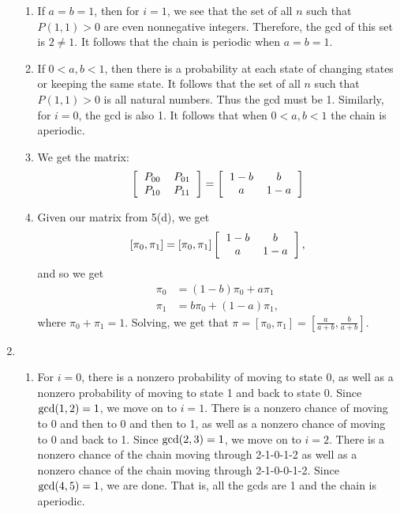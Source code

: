 \begin{enumerate}
\begin{enumerate}
        \item If $a = b = 1$, then for $i = 1$, we see that the set of all $n$ such that $P(1, 1) > 0$ are even nonnegative integers. Therefore, the gcd of this set is $2 \neq 1$. It follows that the chain is periodic when $a = b = 1$.
        
        \item If $0 < a, b < 1$, then there is a probability at each state of changing states or keeping the same state. It follows that the set of all $n$ such that $P(1, 1) > 0$ is all natural numbers. Thus the gcd must be 1. Similarly, for $i = 0$, the gcd is also 1. It follows that when $0 < a, b < 1$ the chain is aperiodic.
        
        \item We get the matrix:
        \[
        \left[\begin{tabular}{cc}
            $P_{00}$ & $P_{01}$ \\
            $P_{10}$ & $P_{11}$
        \end{tabular}\right]
        =
        \left[\begin{tabular}{cc}
            $1 - b$ & $b$ \\
            $a$ & $1 - a$
        \end{tabular}\right]
        \]
        
        \item Given our matrix from 5(d), we get
        \[
            [\pi_0, \pi_1] = [\pi_0, \pi_1]\left[\begin{tabular}{cc}
            $1 - b$ & $b$ \\
            $a$ & $1 - a$
        \end{tabular}\right],
        \]
        and so we get
        \begin{align*}
            \pi_0 &= (1 - b)\pi_0 + a\pi_1 \\
            \pi_1 &= b\pi_0 + (1 - a)\pi_1,
        \end{align*}
        where $\pi_0 + \pi_1 = 1$. Solving, we get that $\pi = [\pi_0, \pi_1] = \left[\frac{a}{a + b}, \frac{b}{a + b}\right]$.
    \end{enumerate}
    
    \item \begin{enumerate}
        \item For $i = 0$, there is a nonzero probability of moving to state 0, as well as a nonzero probability of moving to state 1 and back to state 0. Since $\text{gcd}(1, 2) = 1$, we move on to $i = 1$. There is a nonzero chance of moving to 0 and then to 0 and then to 1, as well as a nonzero chance of moving to 0 and back to 1. Since $\text{gcd}(2, 3) = 1$, we move on to $i = 2$. There is a nonzero chance of the chain moving through 2-1-0-1-2 as well as a nonzero chance of the chain moving through 2-1-0-0-1-2. Since $\text{gcd}(4, 5) = 1$, we are done. That is, all the gcds are 1 and the chain is aperiodic.
        

\end{enumerate}
\end{enumerate}
